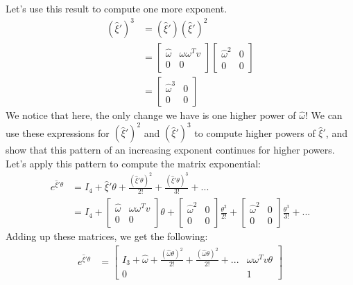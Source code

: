 \documentclass[oneside]{book}
\begin{document}
Let's use this result to compute one more exponent.
\begin{align}
    (\hat\xi')^3 
    &= (\hat\xi')(\hat\xi')^2 \\
    &= \begin{bmatrix}
    \hat\omega & \omega\omega^Tv\\
    0 & 0
    \end{bmatrix}
    \begin{bmatrix}
    \hat\omega^2 & 0\\
    0 & 0
    \end{bmatrix}\\
    &= 
    \begin{bmatrix}
    \hat\omega^3 & 0\\
    0 & 0
    \end{bmatrix}
\end{align}
We notice that here, the only change we have is one higher power of $\hat\omega$! We can use these expressions for $(\hat\xi')^2$ and $(\hat\xi')^3$ to compute higher powers of $\hat\xi'$, and show that this pattern of an increasing exponent continues for higher powers.\\
Let's apply this pattern to compute the matrix exponential:
\begin{align}
    e^{\hat\xi'\theta} &= I_4 + \hat\xi'\theta + \frac{(\hat\xi'\theta)^2}{2!} + \frac{(\hat\xi'\theta)^3}{3!} + ...\\
    &= 
    I_4 + \begin{bmatrix}
    \hat\omega & \omega\omega^Tv\\
    0 & 0
    \end{bmatrix}\theta
    +
    \begin{bmatrix}
    \hat\omega^2 & 0\\
    0 & 0
    \end{bmatrix}\frac{\theta^2}{2!}
    +
    \begin{bmatrix}
    \hat\omega^2 & 0\\
    0 & 0
    \end{bmatrix}\frac{\theta^3}{3!} + ...
\end{align}
Adding up these matrices, we get the following:
\begin{align}
    e^{\hat\xi'\theta}
    &= 
    \begin{bmatrix}
    I_3 + \hat\omega + \frac{(\hat\omega\theta)^2}{2!} + \frac{(\hat\omega\theta)^2}{2!} + ... & \omega\omega^Tv\theta\\
    0 & 1
    \end{bmatrix}
\end{align}
\end{document}
